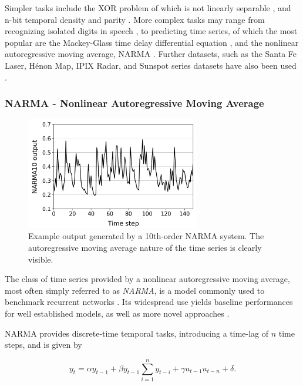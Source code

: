 Simpler tasks include the XOR problem of which is not linearly separable
\cite{goos_pattern_2003}, and n-bit temporal density and parity
\cite{bertschinger_real-time_2004}. More complex tasks may range from
recognizing isolated digits in speech \cite{verstraeten_isolated_2005}, to
predicting time series, of which the most popular are the Mackey-Glass time
delay differential equation \cite{mackey_oscillation_1977}, and the nonlinear
autoregressive moving average, NARMA \cite{atiya_new_2000}. Further datasets,
such as the Santa Fe Laser, Hénon Map, IPIX Radar, and Sunspot series datasets
have also been used \cite{rodan_minimum_2011}.

\subsubsection{NARMA - Nonlinear Autoregressive Moving Average}

\begin{figure}[t!]
  \centering
  \includegraphics[width=3.0in]{figures/NARMA10.png}
  \caption{
    Example output generated by a 10th-order NARMA system. The autoregressive
moving average nature of the time series is clearly visible.
  }
  \label{fig:narma10}
\end{figure}

The class of time series provided by a nonlinear autoregressive moving average,
most often simply referred to as \textit{NARMA}, is a model commonly used to
benchmark recurrent networks \cite{atiya_new_2000}. Its widespread use yields
baseline performances for well established models, as well as more novel
approaches \cite{verstraeten_experimental_2007, appeltant_information_2011}.

NARMA provides discrete-time temporal tasks, introducing a time-lag of $n$ time
steps, and is given by

\begin{equation}
  y_{t} = \alpha y_{t-1} +
  \beta y_{t-1} \sum_{i=1}^{n}y_{t-i} +
  \gamma u_{t-1}u_{t-n} +
  \delta
  .
  \label{eq:narma}
\end{equation}

